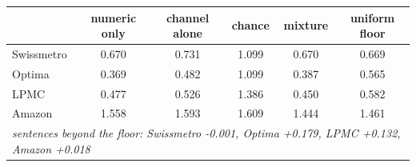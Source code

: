\begin{tabular}{lccccc}
\toprule
& numeric only & channel alone & chance & mixture & uniform floor \\
\midrule
Swissmetro & 0.670 & 0.731 & 1.099 & 0.670 & 0.669 \\
Optima & 0.369 & 0.482 & 1.099 & 0.387 & 0.565 \\
LPMC & 0.477 & 0.526 & 1.386 & 0.450 & 0.582 \\
Amazon & 1.558 & 1.593 & 1.609 & 1.444 & 1.461 \\
\midrule
\multicolumn{6}{l}{\emph{sentences beyond the floor: Swissmetro -0.001, Optima +0.179, LPMC +0.132, Amazon +0.018}} \\
\bottomrule
\end{tabular}